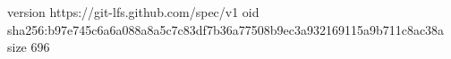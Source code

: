 version https://git-lfs.github.com/spec/v1
oid sha256:b97e745c6a6a088a8a5c7c83df7b36a77508b9ec3a932169115a9b711c8ac38a
size 696
